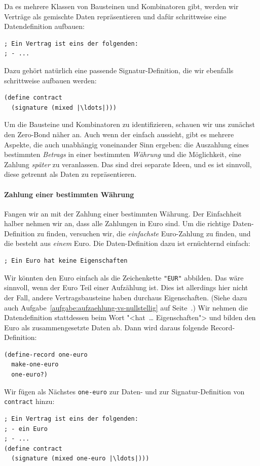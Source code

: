 Da es mehrere Klassen von Bausteinen und Kombinatoren gibt, werden wir
Verträge als gemischte Daten repräsentieren und dafür schrittweise
eine Datendefinition aufbauen:
%
\begin{lstlisting}
; Ein Vertrag ist eins der folgenden:
; - ...
\end{lstlisting}
%
Dazu gehört natürlich eine passende Signatur-Definition, die wir
ebenfalls schrittweise aufbauen werden:
%
\begin{lstlisting}
(define contract
  (signature (mixed |\ldots|)))
\end{lstlisting}
%
Um die Bausteine und Kombinatoren zu identifizieren, schauen wir uns
zunächst den Zero-Bond näher an.  Auch wenn der einfach aussieht, gibt
es mehrere Aspekte, die auch unabhängig voneinander Sinn ergeben: die
Auszahlung eines bestimmten \textit{Betrags} in einer bestimmten
\textit{Währung} und die Möglichkeit, eine Zahlung \textit{später} zu
veranlassen.  Das sind drei separate Ideen, und es ist sinnvoll, diese
getrennt als Daten zu repräsentieren.

\paragraph{Zahlung einer bestimmten Währung}
Fangen wir an mit der Zahlung einer bestimmten Währung.  Der
Einfachheit halber nehmen wir an, dass alle Zahlungen in Euro sind.
Um die richtige Daten-Definition zu finden, versuchen wir, die
\emph{einfachste} Euro-Zahlung zu finden, und die besteht aus
\emph{einem} Euro.  Die Daten-Definition dazu ist ernüchternd einfach:
%
\begin{lstlisting}
; Ein Euro hat keine Eigenschaften
\end{lstlisting}
%
Wir könnten den Euro einfach als die Zeichenkette \lstinline{"EUR"}
abbilden.  Das wäre sinnvoll, wenn der Euro Teil einer Aufzählung ist.
Dies ist allerdings hier nicht der Fall, andere Vertragsbausteine haben
durchaus Eigenschaften.  (Siehe dazu auch
Aufgabe~\ref{aufgabe:aufzaehlung-vs-nullstellig} auf
Seite~\pageref{aufgabe:aufzaehlung-vs-nullstellig}.)  Wir nehmen die
Datendefinition stattdessen beim Wort "<hat~\ldots{} Eigenschaften">
und bilden den Euro als zusammengesetzte Daten ab.  Dann wird daraus
folgende Record-Definition:
%
\begin{lstlisting}
(define-record one-euro
  make-one-euro
  one-euro?)
\end{lstlisting}
%
Wir fügen als Nächstes \lstinline{one-euro} zur Daten- und zur
Signatur-Definition von \lstinline{contract} hinzu:
%
\begin{lstlisting}
; Ein Vertrag ist eins der folgenden:
; - ein Euro
; - ...
(define contract
  (signature (mixed one-euro |\ldots|)))
\end{lstlisting}
%
